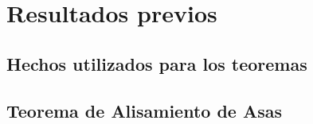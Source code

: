 
\chapter{Resultados previos}


\section{Hechos utilizados para los teoremas}

	

\section{Teorema de Alisamiento de Asas}

	

\endinput
